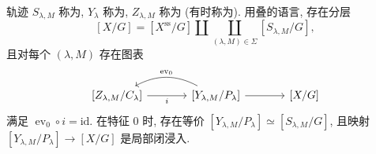 \begin{remark}[层, 叶片与中心]\label{src:8.7.2}
轨迹 $S_{\lambda,M}$ 称为, $Y_\lambda$ 称为, $Z_{\lambda,M}$ 称为 (有时称为). 用叠的语言, 存在分层
\[
[X/G]=[X^{\mathrm{ss}}/G]\amalg\coprod_{(\lambda,M)\in\Sigma}[S_{\lambda,M}/G],
\]
且对每个 $(\lambda,M)$ 存在图表
\begin{equation}\label{src:8.7.3}
\begin{tikzcd}[ampersand replacement=\&,column sep=large]
{[Z_{\lambda,M}/C_\lambda]}\arrow[r,"i"']\&{[Y_{\lambda,M}/P_\lambda]}\arrow[l,bend right=28,"\operatorname{ev}_0"']\arrow[r]\&{[X/G]}
\end{tikzcd}
\end{equation}
满足 $\operatorname{ev}_0\circ i=\mathrm{id}$. 在特征 $0$ 时, 存在等价 $[Y_{\lambda,M}/P_\lambda]\simeq[S_{\lambda,M}/G]$, 且映射 $[Y_{\lambda,M}/P_\lambda]\to[X/G]$ 是局部闭浸入.
\end{remark}
